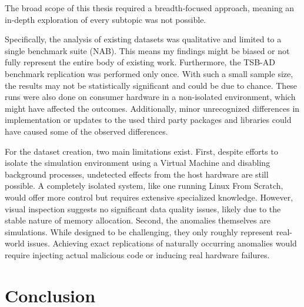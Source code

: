 \documentclass[12pt,oneside]{article}
\begin{document}
The broad scope of this thesis required a breadth-focused approach, meaning an in-depth exploration of every subtopic was not possible. \par
Specifically, the analysis of existing datasets was qualitative and limited to a single benchmark suite (NAB). This means my findings might be biased or not fully represent the entire body of existing work.
Furthermore, the TSB-AD benchmark replication was performed only once. With such a small sample size, the results may not be statistically significant and could be due to chance. These runs were also done on consumer hardware in a non-isolated environment, which might have affected the outcomes. Additionally, minor unrecognized differences in implementation or updates to the used third party packages and libraries could have caused some of the observed differences. \par
For the dataset creation, two main limitations exist. First, despite efforts to isolate the simulation environment using a Virtual Machine and disabling background processes, undetected effects from the host hardware are still possible. A completely isolated system, like one running Linux From Scratch, would offer more control but requires extensive specialized knowledge. However, visual inspection suggests no significant data quality issues, likely due to the stable nature of memory allocation. Second, the anomalies themselves are simulations. While designed to be challenging, they only roughly represent real-world issues. Achieving exact replications of naturally occurring anomalies would require injecting actual malicious code or inducing real hardware failures.

\section{Conclusion}
\end{document}
